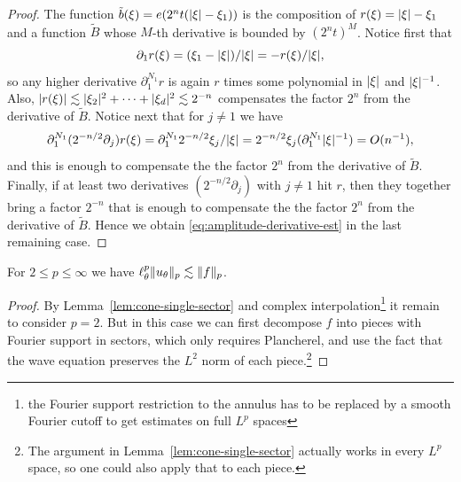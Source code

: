 \begin{proof}
The function $\tilde{b}(\xi) = e(2^{n}t(\lvert\xi\rvert-\xi_{1}))$ is the composition of $r(\xi) = \lvert\xi\rvert-\xi_{1}$ and a function $\tilde{B}$ whose $M$-th derivative is bounded by $(2^{n}t)^{M}$.
Notice first that
\[
\partial_{1}r(\xi) = (\xi_{1}-\lvert\xi\rvert)/\lvert\xi\rvert = -r(\xi)/\lvert\xi\rvert,
\]
so any higher derivative $\partial_{1}^{N_{1}}r$ is again $r$ times some polynomial in $\lvert\xi\rvert$ and $\lvert\xi\rvert^{-1}$.
Also, $\lvert r(\xi)\rvert \lesssim \lvert\xi_{2}\rvert^{2} + \dotsb + \lvert\xi_{d}\rvert^{2} \lesssim 2^{-n}$ compensates the factor $2^{n}$ from the derivative of $\tilde{B}$.
Notice next that for $j \neq 1$ we have
\[
\partial_{1}^{N_{1}} (2^{-n/2}\partial_{j}) r(\xi)
=
\partial_{1}^{N_{1}} 2^{-n/2} \xi_{j}/\lvert\xi\rvert
=
2^{-n/2} \xi_{j} (\partial_{1}^{N_{1}} \lvert\xi\rvert^{-1})
=
O(n^{-1}),
\]
and this is enough to compensate the the factor $2^{n}$ from the derivative of $\tilde{B}$.
Finally, if at least two derivatives $(2^{-n/2}\partial_{j})$ with $j\neq 1$ hit $r$, then they together bring a factor $2^{-n}$ that is enough to compensate the the factor $2^{n}$ from the derivative of $\tilde{B}$.
Hence we obtain \eqref{eq:amplitude-derivative-est} in the last remaining case.
\end{proof}

\begin{corollary}[{\cite[Lemma 6.1]{MR1800068}}]
\label{cor:cone-sectors-lp}
For $2 \leq p \leq \infty$ we have $\ell^{p}_{\theta} \lVert u_{\theta}\rVert_{p} \lesssim \lVert f\rVert_{p}$.
\end{corollary}
\begin{proof}
By Lemma~\ref{lem:cone-single-sector} and complex interpolation\footnote{the Fourier support restriction to the annulus has to be replaced by a smooth Fourier cutoff to get estimates on full $L^{p}$ spaces} it remain to consider $p=2$.
But in this case we can first decompose $f$ into pieces with Fourier support in sectors, which only requires Plancherel, and use the fact that the wave equation preserves the $L^{2}$ norm of each piece.\footnote{The argument in Lemma~\ref{lem:cone-single-sector} actually works in every $L^{p}$ space, so one could also apply that to each piece.}
\end{proof}

